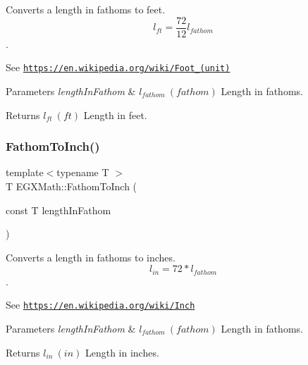 Converts a length in fathoms to feet. \[ l_{ft}= \frac{72}{12} l_{fathom} \]. 

See \href{https://en.wikipedia.org/wiki/Foot_(unit)}{\tt https\+://en.\+wikipedia.\+org/wiki/\+Foot\+\_\+(unit)} 
\begin{DoxyParams}{Parameters}
{\em length\+In\+Fathom} & $ l_{fathom}\ (fathom)$ Length in fathoms. \\
\hline
\end{DoxyParams}
\begin{DoxyReturn}{Returns}
$ l_{ft}\ (ft)$ Length in feet. 
\end{DoxyReturn}
\mbox{\label{group___e_g_x_math-_conversions-_length_conversions-_imperial-_fathom-_imperial_ga92c156dbffb555541217b319e8cafb72}} 
\subsubsection{\texorpdfstring{Fathom\+To\+Inch()}{FathomToInch()}}
{\footnotesize\ttfamily template$<$typename T $>$ \\
T E\+G\+X\+Math\+::\+Fathom\+To\+Inch (\begin{DoxyParamCaption}\item[{const T}]{length\+In\+Fathom }\end{DoxyParamCaption})}



Converts a length in fathoms to inches. \[ l_{in}=72 * l_{fathom} \]. 

See \href{https://en.wikipedia.org/wiki/Inch}{\tt https\+://en.\+wikipedia.\+org/wiki/\+Inch} 
\begin{DoxyParams}{Parameters}
{\em length\+In\+Fathom} & $ l_{fathom}\ (fathom)$ Length in fathoms. \\
\hline
\end{DoxyParams}
\begin{DoxyReturn}{Returns}
$ l_{in}\ (in)$ Length in inches. 
\end{DoxyReturn}
\mbox{\label{group___e_g_x_math-_conversions-_length_conversions-_imperial-_fathom-_imperial_ga1bdfdd0f208b878241772cc584fa4d1d}} 
